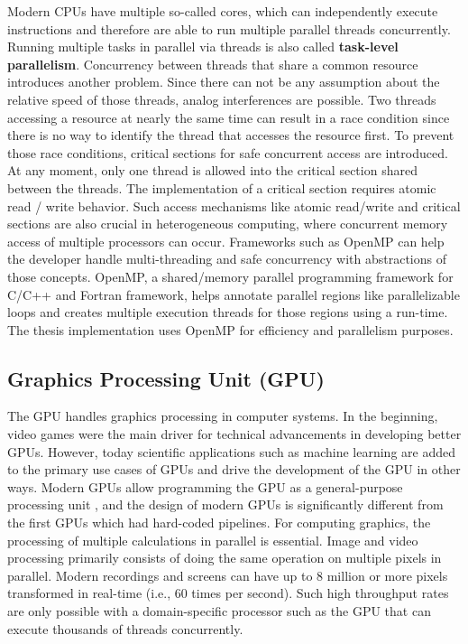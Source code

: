 Modern CPUs have multiple so-called cores, which can independently execute instructions and therefore are able to run multiple parallel threads concurrently. Running multiple tasks in parallel via threads is also called \textbf{task-level parallelism}.
Concurrency between threads that share a common resource introduces another problem. Since there can not be any assumption about the relative speed of those threads, analog interferences are possible. Two threads accessing a resource at nearly the same time can result in a race condition since there is no way to identify the thread that accesses the resource first. To prevent those race conditions, critical sections for safe concurrent access are introduced. At any moment, only one thread is allowed into the critical section shared between the threads. The implementation of a critical section requires atomic read / write behavior.
Such access mechanisms like atomic read/write and critical sections are also crucial in heterogeneous computing, where concurrent memory access of multiple processors can occur.
Frameworks such as OpenMP can help the developer handle multi-threading and safe concurrency with abstractions of those concepts. OpenMP, a shared/memory parallel programming framework for C/C++ and Fortran framework, helps annotate parallel regions like parallelizable loops and creates multiple execution threads for those regions using a run-time.
The thesis implementation uses OpenMP for efficiency and parallelism purposes.

\subsection{Graphics Processing Unit (GPU)}
The GPU handles graphics processing in computer systems. In the beginning, video games were the main driver for technical advancements in developing better GPUs. However, today scientific applications such as machine learning are added to the primary use cases of GPUs and drive the development of the GPU in other ways. Modern GPUs allow programming the GPU as a general-purpose processing unit \cite{nickollsGPUComputingEra2010}, and the design of modern GPUs is significantly different from the first GPUs which had hard-coded pipelines. For computing graphics, the processing of multiple calculations in parallel is essential. Image and video processing primarily consists of doing the same operation on multiple pixels in parallel. Modern recordings and screens can have up to 8 million or more pixels transformed in real-time (i.e., 60 times per second). Such high throughput rates are only possible with a domain-specific processor such as the GPU that can execute thousands of threads concurrently.

